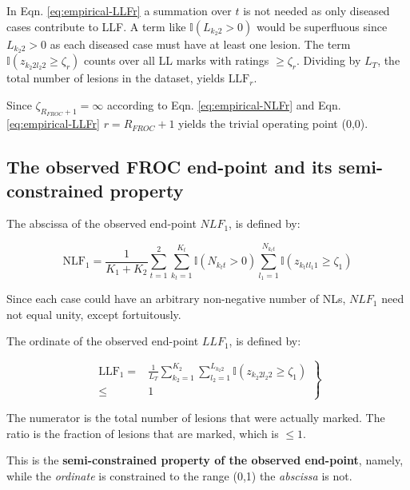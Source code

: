 \documentclass[
]{book}
\begin{document}
In Eqn. \eqref{eq:empirical-LLFr} a summation over \(t\) is not needed as only diseased cases contribute to LLF. A term like \(\mathbb{I} \left ( L_{k_2 2} > 0 \right )\) would be superfluous since \(L_{k_2 2} > 0\) as each diseased case must have at least one lesion. The term \(\mathbb{I} \left ( z_{k_2 2 l_2 2} \geq \zeta_r \right )\) counts over all LL marks with ratings \(\geq \zeta_r\). Dividing by \(L_T\), the total number of lesions in the dataset, yields \(\text{LLF}_r\).

Since \(\zeta_{R_{FROC}+1} = \infty\) according to Eqn. \eqref{eq:empirical-NLFr} and Eqn. \eqref{eq:empirical-LLFr} \(r = R_{FROC}+1\) yields the trivial operating point (0,0).

\hypertarget{empirical-end-point}{%
\subsection{The observed FROC end-point and its semi-constrained property}\label{empirical-end-point}}

The abscissa of the observed end-point \(NLF_1\), is defined by:

\begin{equation}
\text{NLF}_1 = \frac{1}{K_1+K_2} \sum_{t=1}^{2} \sum_{k_t=1}^{K_t} \mathbb{I} \left ( N_{k_t t} > 0 \right ) \sum_{l_1=1}^{N_{k_t t}} \mathbb{I} \left ( z_{k_t t l_1 1} \geq \zeta_1 \right ) 
\label{eq:empirical-NLF11}
\end{equation}

Since each case could have an arbitrary non-negative number of NLs, \(NLF_1\) need not equal unity, except fortuitously.

The ordinate of the observed end-point \(LLF_1\), is defined by:

\begin{equation}
\left.
\begin{aligned}
\text{LLF}_1 =& \frac{1}{L_T} \sum_{k_2=1}^{K_2} \sum_{l_2=1}^{L_{k_2 2}} \mathbb{I} \left ( z_{k_2 2 l_2 2} \geq  \zeta_1  \right ) \\
\leq& 1
\end{aligned}
\right \}
\label{eq:empirical-LLF1a}
\end{equation}

The numerator is the total number of lesions that were actually marked. The ratio is the fraction of lesions that are marked, which is \(\leq 1\).

This is the \textbf{semi-constrained property of the observed end-point}, namely, while the \emph{ordinate} is constrained to the range (0,1) the \emph{abscissa} is not.
\end{document}

